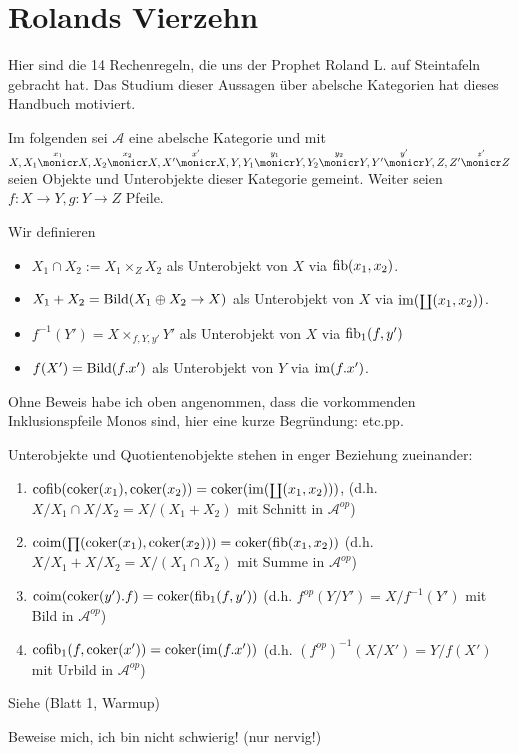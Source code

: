 \section{Rolands Vierzehn}

Hier sind die 14 Rechenregeln, die uns der Prophet Roland L. auf Steintafeln gebracht hat. Das Studium dieser Aussagen über abelsche Kategorien hat dieses Handbuch motiviert.

Im folgenden sei $\mathcal A$ eine abelsche Kategorie und mit $X,
X_1 \overset{x_1}\monicr X,
X_2 \overset{x_2}\monicr X,
X'  \overset{x'}\monicr X,
Y,
Y_1 \overset{y_1}\monicr Y,
Y_2 \overset{y_2}\monicr Y,
Y'  \overset{y'}\monicr Y,
Z,
Z'  \overset{z'}\monicr Z$
seien Objekte und Unterobjekte dieser Kategorie gemeint.
Weiter seien $f:X\to Y, g:Y\to Z$ Pfeile.

\begin{defn}[Objektnotation]
Wir definieren
\begin{itemize}
\item $X_1 \cap X_2 := X_1\times_Z X_2$ als Unterobjekt von $X$ via $\operatorname{fib}(x_1, x_2)$.
\item $X_1+X_2 = \operatorname{Bild}(X_1 \oplus X_2 \to X)$ als Unterobjekt von $X$ via $\operatorname{im}(\operatorname{\scriptstyle\coprod}(x_1,x_2))$.
\item $f^{-1}(Y') = X \times_{f,Y,y'} Y'$ als Unterobjekt von $X$ via $\operatorname{fib}_1(f,y')$
\item $f(X') = \operatorname{Bild}(f.x')$ als Unterobjekt von $Y$ via $\operatorname{im}(f.x')$.
\end{itemize}
\end{defn}

\begin{bem}
Ohne Beweis habe ich oben angenommen, dass die vorkommenden Inklusionspfeile Monos sind, hier eine kurze Begründung: etc.pp. %
\end{bem}

\begin{prop}[Reflexionsprinzip]
Unterobjekte und Quotientenobjekte stehen in enger Beziehung zueinander:
\begin{enumerate}
\item $\operatorname{cofib}(\operatorname{coker}(x_1), \operatorname{coker}(x_2)) = \operatorname{coker}(\operatorname{im}(\operatorname{\scriptstyle\coprod}(x_1,x_2)))$, (d.h. $X/X_1 \cap X/X_2 = X/(X_1+X_2)$ mit Schnitt in $\mathcal A^{op}$)
\item $\operatorname{coim}(\operatorname{\scriptstyle\prod}(\operatorname{coker}(x_1),\operatorname{coker}(x_2))) = \operatorname{coker}(\operatorname{fib}(x_1,x_2))$ (d.h. $X/X_1 + X/X_2 = X/(X_1\cap X_2)$ mit Summe in $\mathcal A^{op}$)
\item $\operatorname{coim}(\operatorname{coker}(y').f) = \operatorname{coker}(\operatorname{fib}_1(f,y'))$ (d.h. $f^{op}(Y/Y') = X/f^{-1}(Y')$ mit Bild in $\mathcal A^{op}$)
\item $\operatorname{cofib}_1(f,\operatorname{coker}(x')) = \operatorname{coker}(\operatorname{im}(f.x'))$ (d.h. $(f^{op})^{-1}(X/X') = Y/f(X')$ mit Urbild in $\mathcal A^{op}$)
\end{enumerate}
Siehe (Blatt 1, Warmup)
\end{prop}
\begin{bew}
Beweise mich, ich bin nicht schwierig! (nur nervig!)
\end{bew}

